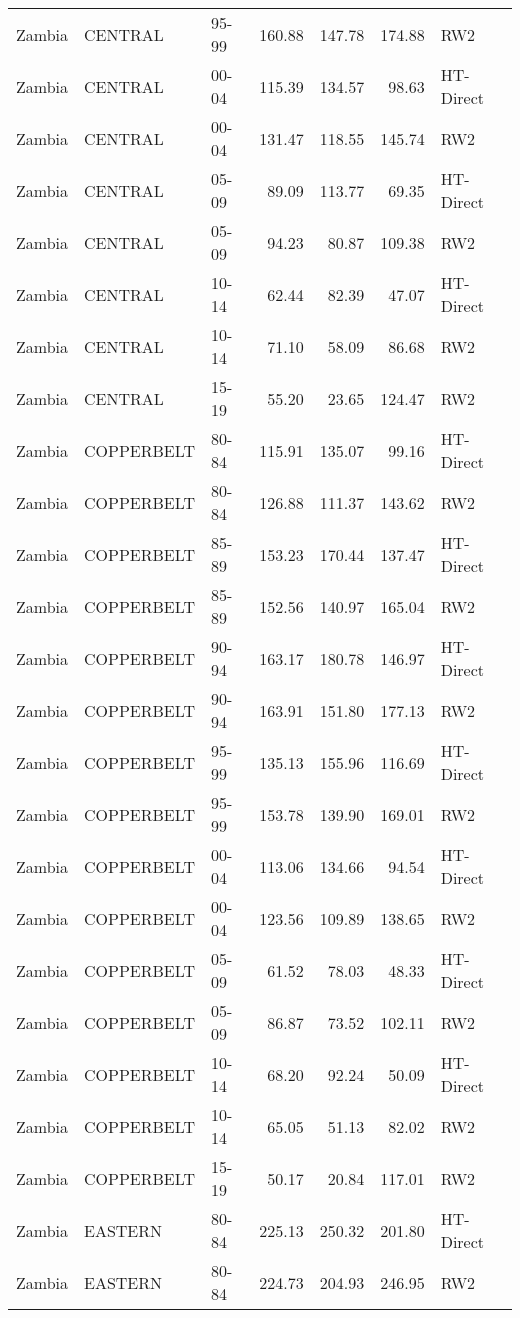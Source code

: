 \begin{longtable}{lllrrrl}
  Zambia & CENTRAL & 95-99 & 160.88 & 147.78 & 174.88 & RW2 \\ 
  Zambia & CENTRAL & 00-04 & 115.39 & 134.57 & 98.63 & HT-Direct \\ 
  Zambia & CENTRAL & 00-04 & 131.47 & 118.55 & 145.74 & RW2 \\ 
  Zambia & CENTRAL & 05-09 & 89.09 & 113.77 & 69.35 & HT-Direct \\ 
  Zambia & CENTRAL & 05-09 & 94.23 & 80.87 & 109.38 & RW2 \\ 
  Zambia & CENTRAL & 10-14 & 62.44 & 82.39 & 47.07 & HT-Direct \\ 
  Zambia & CENTRAL & 10-14 & 71.10 & 58.09 & 86.68 & RW2 \\ 
  Zambia & CENTRAL & 15-19 & 55.20 & 23.65 & 124.47 & RW2 \\ 
  Zambia & COPPERBELT & 80-84 & 115.91 & 135.07 & 99.16 & HT-Direct \\ 
  Zambia & COPPERBELT & 80-84 & 126.88 & 111.37 & 143.62 & RW2 \\ 
  Zambia & COPPERBELT & 85-89 & 153.23 & 170.44 & 137.47 & HT-Direct \\ 
  Zambia & COPPERBELT & 85-89 & 152.56 & 140.97 & 165.04 & RW2 \\ 
  Zambia & COPPERBELT & 90-94 & 163.17 & 180.78 & 146.97 & HT-Direct \\ 
  Zambia & COPPERBELT & 90-94 & 163.91 & 151.80 & 177.13 & RW2 \\ 
  Zambia & COPPERBELT & 95-99 & 135.13 & 155.96 & 116.69 & HT-Direct \\ 
  Zambia & COPPERBELT & 95-99 & 153.78 & 139.90 & 169.01 & RW2 \\ 
  Zambia & COPPERBELT & 00-04 & 113.06 & 134.66 & 94.54 & HT-Direct \\ 
  Zambia & COPPERBELT & 00-04 & 123.56 & 109.89 & 138.65 & RW2 \\ 
  Zambia & COPPERBELT & 05-09 & 61.52 & 78.03 & 48.33 & HT-Direct \\ 
  Zambia & COPPERBELT & 05-09 & 86.87 & 73.52 & 102.11 & RW2 \\ 
  Zambia & COPPERBELT & 10-14 & 68.20 & 92.24 & 50.09 & HT-Direct \\ 
  Zambia & COPPERBELT & 10-14 & 65.05 & 51.13 & 82.02 & RW2 \\ 
  Zambia & COPPERBELT & 15-19 & 50.17 & 20.84 & 117.01 & RW2 \\ 
  Zambia & EASTERN & 80-84 & 225.13 & 250.32 & 201.80 & HT-Direct \\ 
  Zambia & EASTERN & 80-84 & 224.73 & 204.93 & 246.95 & RW2 \\ 

\end{longtable}
